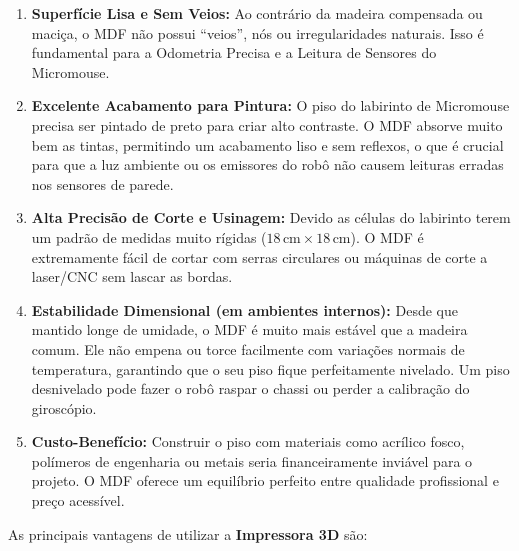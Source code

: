 \begin{enumerate}
    \item \textbf{Superfície Lisa e Sem Veios:} Ao contrário da madeira compensada ou maciça, o MDF não possui ``veios'', nós ou irregularidades naturais. Isso é fundamental para a Odometria Precisa e a Leitura de Sensores do Micromouse.
    
    \item \textbf{Excelente Acabamento para Pintura:} O piso do labirinto de Micromouse precisa ser pintado de preto para criar alto contraste. O MDF absorve muito bem as tintas, permitindo um acabamento liso e sem reflexos, o que é crucial para que a luz ambiente ou os emissores do robô não causem leituras erradas nos sensores de parede.
    
    \item \textbf{Alta Precisão de Corte e Usinagem:} Devido as células do labirinto terem um padrão de medidas muito rígidas ($18\,\text{cm} \times 18\,\text{cm}$). O MDF é extremamente fácil de cortar com serras circulares ou máquinas de corte a laser/CNC sem lascar as bordas. 
    
    \item \textbf{Estabilidade Dimensional (em ambientes internos):} Desde que mantido longe de umidade, o MDF é muito mais estável que a madeira comum. Ele não empena ou torce facilmente com variações normais de temperatura, garantindo que o seu piso fique perfeitamente nivelado. Um piso desnivelado pode fazer o robô raspar o chassi ou perder a calibração do giroscópio.
    
    \item \textbf{Custo-Benefício:} Construir o piso com materiais como acrílico fosco, polímeros de engenharia ou metais seria financeiramente inviável para o projeto. O MDF oferece um equilíbrio perfeito entre qualidade profissional e preço acessível.    
\end{enumerate}

As principais vantagens de utilizar a \textbf{Impressora 3D} são:

